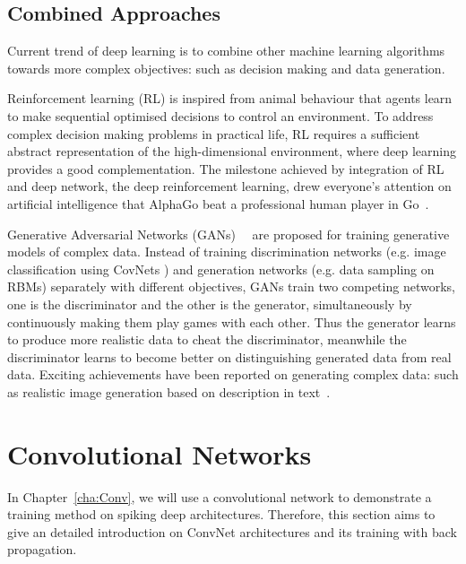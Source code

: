 \subsection{Combined Approaches}
Current trend of deep learning is to combine other machine learning algorithms towards more complex objectives: such as decision making and data generation.

Reinforcement learning (RL) is inspired from animal behaviour that agents learn to make sequential optimised decisions to control an environment.
To address complex decision making problems in practical life, RL requires a sufficient abstract representation of the high-dimensional environment, where deep learning provides a good complementation.
The milestone achieved by integration of RL and deep network, the deep reinforcement learning, drew everyone's attention on artificial intelligence that AlphaGo beat a professional human player in Go~\cite{silver2016mastering}.

Generative Adversarial Networks (GANs)~~\cite{goodfellow2014generative} are proposed for training generative models of complex data.
Instead of training discrimination networks (e.g. image classification using CovNets ) and generation networks (e.g. data sampling on RBMs) separately with different objectives, GANs train two competing networks, one is the discriminator and the other is the generator, simultaneously by continuously making them play games with each other.
Thus the generator learns to produce more realistic data to cheat the discriminator, meanwhile the discriminator learns to become better on distinguishing generated data from real data.
Exciting achievements have been reported on generating complex data: such as realistic image generation based on description in text~\cite{radford2015unsupervised}.

\section{Convolutional Networks}
\label{sec:convnet}
In Chapter~\ref{cha:Conv}, we will use a convolutional network to demonstrate a training method on spiking deep architectures.
Therefore, this section aims to give an detailed introduction on ConvNet architectures and its training with back propagation.
